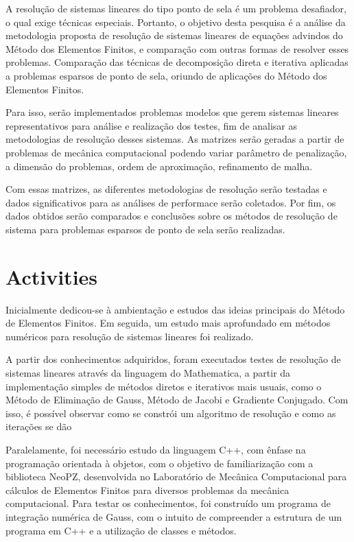 \documentclass[12pt]{article}
\begin{document}
A resolução de sistemas lineares do tipo ponto de sela é um problema desafiador, o qual exige técnicas especiais. Portanto, o objetivo
desta pesquisa é a análise da metodologia proposta de resolução de sistemas lineares de equações advindos do Método dos Elementos Finitos, 
e comparação com outras formas de resolver esses problemas. Comparação das técnicas de decomposição direta e iterativa aplicadas a 
problemas esparsos de ponto de sela, oriundo de aplicações do Método dos Elementos Finitos. 



Para isso, serão implementados problemas modelos que gerem sistemas lineares representativos para análise e realização dos testes, fim de 
analisar as metodologias de resolução desses sistemas. As matrizes serão geradas a partir de problemas de mecânica computacional 
podendo variar parâmetro de penalização, a dimensão do problemas, ordem de aproximação, refinamento de malha. 

Com essas matrizes, as diferentes metodologias de resolução serão testadas e dados significativos para as análises de performace serão coletados.
Por fim, os dados obtidos serão comparados e conclusões sobre os métodos de resolução de sistema para problemas esparsos de ponto de sela serão 
realizadas.

\section{Activities}

Inicialmente dedicou-se à ambientação e estudos das ideias principais do Método de Elementos Finitos. Em seguida, um estudo mais aprofundado em 
métodos numéricos para resolução de sistemas lineares foi realizado. 

A partir dos conhecimentos adquiridos, foram executados testes de resolução de sistemas lineares através da linguagem do Mathematica, a partir da 
implementação simples de métodos diretos e iterativos mais usuais, como o Método de Eliminação de Gauss, Método de Jacobi e Gradiente Conjugado. 
Com isso, é possível observar como se constrói um algoritmo de resolução e como as iterações se dão

Paralelamente, foi necessário estudo da linguagem C++, com ênfase na programação orientada à objetos, com o objetivo de familiarização 
com a biblioteca NeoPZ, desenvolvida no Laboratório de Mecânica Computacional para cálculos de Elementos Finitos para diversos problemas 
da mecânica computacional. Para testar os conhecimentos, foi construído um programa de integração numérica de Gauss, com o intuito de 
compreender a estrutura de um programa em C++ e a utilização de classes e métodos. 
\end{document}
